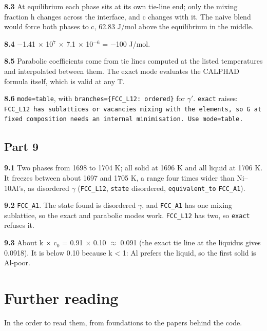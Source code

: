 \documentclass[12pt,a4paper]{article}
\begin{document}
\textbf{8.3} At equilibrium each phase sits at its own tie-line end; only the mixing fraction h changes across the interface, and c changes with it. The naive blend would force both phases to c, 62.83 J/mol above the equilibrium in the middle.

\textbf{8.4} \(-\)1.41 \(\times\) 10\(^{7}\) \(\times\) 7.1 \(\times\) 10\(^{-6}\) = \(-\)100 J/mol.

\textbf{8.5} Parabolic coefficients come from tie lines computed at the listed temperatures and interpolated between them. The exact mode evaluates the CALPHAD formula itself, which is valid at any T.

\textbf{8.6} \texttt{mode=\textquotedbl{}table\textquotedbl{}}, with \texttt{branches=\{\textquotedbl{}FCC\_\allowbreak{}L12\textquotedbl{}: \textquotedbl{}ordered\textquotedbl{}\}} for \(\gamma '\). \texttt{\textquotedbl{}exact\textquotedbl{}} raises: \texttt{FCC\_\allowbreak{}L12 has sublattices or vacancies mixing with the elements,\allowbreak{} so G at fixed composition needs an internal minimisation.\allowbreak{} Use mode=\textquotesingle{}table\textquotesingle{}.\allowbreak{}}


\subsection*{Part 9}
\textbf{9.1} Two phases from 1698 to 1704 K; all solid at 1696 K and all liquid at 1706 K. It freezes between about 1697 and 1705 K, a range four times wider than Ni--10Al's, as disordered \(\gamma\) (\texttt{FCC\_\allowbreak{}L12}, \texttt{state} disordered, \texttt{equivalent\_\allowbreak{}to} \texttt{FCC\_\allowbreak{}A1}).

\textbf{9.2} \texttt{FCC\_\allowbreak{}A1}. The state found is disordered \(\gamma\), and \texttt{FCC\_\allowbreak{}A1} has one mixing sublattice, so the exact and parabolic modes work. \texttt{FCC\_\allowbreak{}L12} has two, so \texttt{\textquotedbl{}exact\textquotedbl{}} refuses it.

\textbf{9.3} About k \(\times\) c\(_{0}\) = 0.91 \(\times\) 0.10 \(\approx\) 0.091 (the exact tie line at the liquidus gives 0.0918). It is below 0.10 because k < 1: Al prefers the liquid, so the first solid is Al-poor.


\section*{Further reading}
In the order to read them, from foundations to the papers behind the code.
\end{document}
